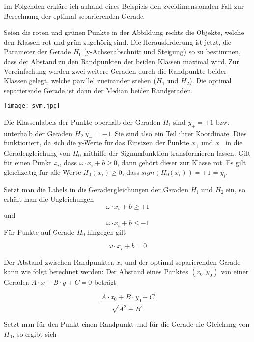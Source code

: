 \documentclass[11pt,ceqn]{book}
\begin{document}
Im Folgenden erkläre ich anhand eines Beispiels den zweidimensionalen Fall zur Berechnung der optimal separierenden Gerade.



\begin{minipage}{0.4\textwidth}\raggedright
Seien die roten und grünen Punkte in der Abbildung rechts die Objekte, welche den Klassen rot und grün zugehörig sind. Die Herausforderung ist jetzt, die Parameter der Gerade $H_0$ (y-Achsenabschnitt und Steigung) so zu bestimmen, dass der Abstand zu den Randpunkten der beiden Klassen maximal wird. Zur Vereinfachung werden zwei weitere Geraden durch die Randpunkte beider Klassen gelegt, welche parallel zueinander stehen ($H_1$ und $H_2$). Die optimal separierende Gerade ist dann der Median beider Randgeraden.
\end{minipage}
\hfill
\begin{minipage}{0.5\textwidth}
\texttt{[image: svm.jpg]}
\end{minipage}

Die Klassenlabels der Punkte oberhalb der Geraden $H_1$ sind $y_+ = +1$ bzw. unterhalb der Geraden $H_2$ $y_- = -1$. Sie sind also ein Teil ihrer Koordinate. Dies funktioniert, da sich die y-Werte für das Einstzen der Punkte $x_+$ und $x_-$ in die Geradengleichung von $H_0$ mithilfe der Signumfunktion transformieren lassen. Gilt für einen Punkt $x_i$, dass $\omega \cdot x_i + b \geqslant 0$, dann gehört dieser zur Klasse rot. Es gilt gleichzeitig für alle Werte $H_0(x_i) \geqslant 0$, dass $sign(H_0(x_i)) = +1 = y_i$.

Setzt man die Labels in die Geradengleichungen der Geraden $H_1$ und $H_2$ ein, so erhält man die Ungleichungen
\begin{equation} \label{hplus}
\omega \cdot x_i +b \geqslant +1
\end{equation}
und 
\begin{equation} \label{hminus}
\omega \cdot x_i +b \leqslant -1
\end{equation}
Für Punkte auf Gerade $H_0$ hingegen gilt 

$$\omega \cdot x_i +b = 0$$

Der Abstand zwischen Randpunkten $x_i$ und der optimal separierenden Gerade kann wie folgt berechnet werden: Der Abstand eines Punktes $(x_0, y_0)$ von einer Geraden $A \cdot x + B \cdot y + C = 0$ beträgt
  
$$\frac{A \cdot x_0 + B \cdot y_0 +C}{\sqrt{A^2 + B^2}}$$

Setzt man für den Punkt einen Randpunkt und für die Gerade die Gleichung von $H_0$, so ergibt sich 
\end{document}
